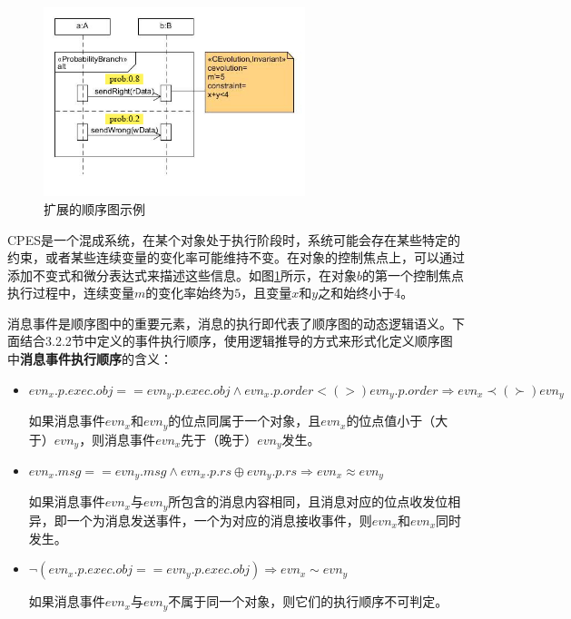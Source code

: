 	\begin{figure}[!t]
	\centering
	\includegraphics[width=3in]{example-SD.jpg}
	\caption{扩展的顺序图示例}
	\label{example-SD}
	\end{figure}	
	
	CPES是一个混成系统，在某个对象处于执行阶段时，系统可能会存在某些特定的约束，或者某些连续变量的变化率可能维持不变。在对象的控制焦点上，可以通过添加不变式和微分表达式来描述这些信息。如图\ref{example-SD}所示，在对象$b$的第一个控制焦点执行过程中，连续变量$m$的变化率始终为$5$，且变量$x$和$y$之和始终小于4。
	
	消息事件是顺序图中的重要元素，消息的执行即代表了顺序图的动态逻辑语义。下面结合3.2.2节中定义的事件执行顺序，使用逻辑推导的方式来形式化定义顺序图中\textbf{消息事件执行顺序}的含义：
	\begin{itemize}
	\item $evn_{x}.p.exec.obj==evn_{y}.p.exec.obj \wedge evn_{x}.p.order<(>)evn_{y}.p.order \Longrightarrow evn_{x} \prec(\succ) evn_{y}$
	
	如果消息事件$evn_{x}$和$evn_{y}$的位点同属于一个对象，且$evn_{x}$的位点值小于（大于）$evn_{y}$，则消息事件$evn_{x}$先于（晚于）$evn_{y}$发生。
	\item $evn_{x}.msg==evn_{y}.msg \wedge evn_{x}.p.rs \oplus evn_{y}.p.rs \Longrightarrow evn_{x} \approx evn_{y}$
	
	如果消息事件$evn_{x}$与$evn_{y}$所包含的消息内容相同，且消息对应的位点收发位相异，即一个为消息发送事件，一个为对应的消息接收事件，则$evn_{x}$和$evn_{x}$同时发生。
	\item $\neg (evn_{x}.p.exec.obj==evn_{y}.p.exec.obj) \Longrightarrow evn_{x} \sim evn_{y}$
	
	如果消息事件$evn_{x}$与$evn_{y}$不属于同一个对象，则它们的执行顺序不可判定。
	\end{itemize}
	
